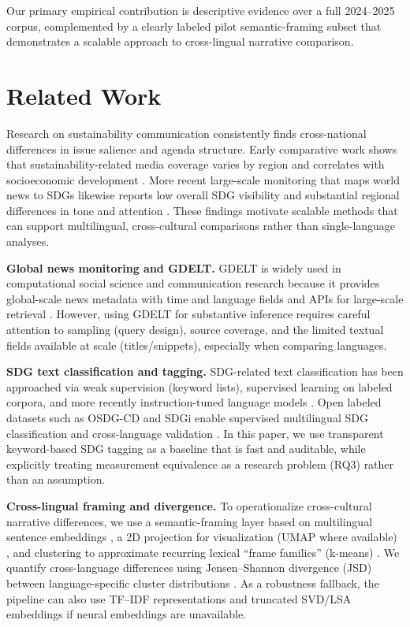 \documentclass[11pt]{article}
\begin{document}
Our primary empirical contribution is descriptive evidence over a full 2024--2025 corpus, complemented by a clearly labeled pilot semantic-framing subset that demonstrates a scalable approach to cross-lingual narrative comparison.

\section{Related Work}
Research on sustainability communication consistently finds cross-national differences in issue salience and agenda structure. Early comparative work shows that sustainability-related media coverage varies by region and correlates with socioeconomic development \parencite{barkemeyer2013sustainability}. More recent large-scale monitoring that maps world news to SDGs likewise reports low overall SDG visibility and substantial regional differences in tone and attention \parencite{czvetko2021intertwining}. These findings motivate scalable methods that can support multilingual, cross-cultural comparisons rather than single-language analyses.

\textbf{Global news monitoring and GDELT.} GDELT is widely used in computational social science and communication research because it provides global-scale news metadata with time and language fields and APIs for large-scale retrieval \parencite{leetaru2013gdelt,gdelt2015gkgcodebook,hopp2019icore}. However, using GDELT for substantive inference requires careful attention to sampling (query design), source coverage, and the limited textual fields available at scale (titles/snippets), especially when comparing languages.

\textbf{SDG text classification and tagging.} SDG-related text classification has been approached via weak supervision (keyword lists), supervised learning on labeled corpora, and more recently instruction-tuned language models \parencite{pukelis2022osdg20,fankhauser2024sdgllm}. Open labeled datasets such as OSDG-CD and SDGi enable supervised multilingual SDG classification and cross-language validation \parencite{osdgcd2022,skrynnyk2024sdgi,undp2024sdgi}. In this paper, we use transparent keyword-based SDG tagging as a baseline that is fast and auditable, while explicitly treating measurement equivalence as a research problem (RQ3) rather than an assumption.

\textbf{Cross-lingual framing and divergence.} To operationalize cross-cultural narrative differences, we use a semantic-framing layer based on multilingual sentence embeddings \parencite{reimers2019sbert}, a 2D projection for visualization (UMAP where available) \parencite{mcinnes2018umap}, and clustering to approximate recurring lexical ``frame families'' (k-means) \parencite{macqueen1967kmeans}. We quantify cross-language differences using Jensen--Shannon divergence (JSD) between language-specific cluster distributions \parencite{lin1991jsd}. As a robustness fallback, the pipeline can also use TF--IDF representations \parencite{salton1988term} and truncated SVD/LSA embeddings \parencite{deerwester1990indexing} if neural embeddings are unavailable.
\end{document}
